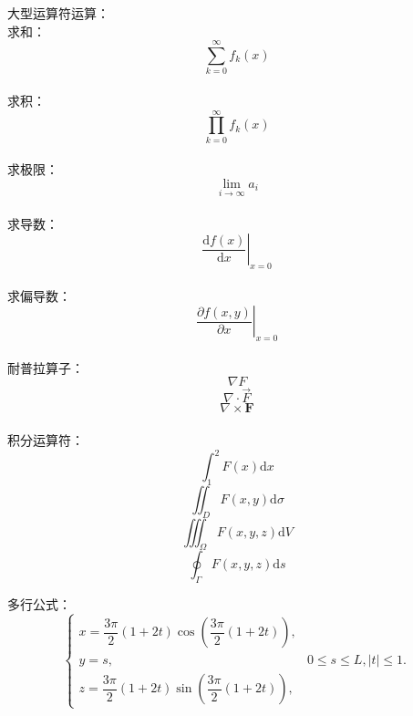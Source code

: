 \documentclass[UTF8,a4paper]{article}
\begin{document}
	
	大型运算符运算：\\%
	求和：\[\sum_{k=0}^{\infty}f_k(x)\]\\%
	求积：\[\prod_{k=0}^{\infty}f_k(x)\]\\
	求极限：\[\lim_{i\to\infty}a_i\]\\
	求导数：\[\left.\frac{\mathrm{d}f(x)}{\mathrm{d}x}\right|_{x=0}\]\\ %
	求偏导数：\[\left.\frac{\partial f(x,y)}{\partial x}\right|_{x=0}\]\\%
	耐普拉算子：\[\nabla F\] \[\nabla \cdot \vec{F}\] \[\nabla \times \mathbf{F}\]\\%
	积分运算符：\[\int_{1}^{2}F(x)\mathrm{d}x\] \[\iint_DF(x,y)\mathrm{d}\sigma\] \[\iiint_{\Omega}F(x,y,z)\mathrm{d}V\] \[\oint_{\Gamma}F(x,y,z)\mathrm{d}s\]
	
	
	多行公式：
	\begin{equation}
	\left\{
	\begin{array}{lr}
	x=\dfrac{3\pi}{2}(1+2t)\cos(\dfrac{3\pi}{2}(1+2t)), &  \\
	y=s, & 0\leq s\leq L,|t|\leq1.\\
	z=\dfrac{3\pi}{2}(1+2t)\sin(\dfrac{3\pi}{2}(1+2t)), &  
	\end{array}
	\right.
	\end{equation}
	
\end{document}
